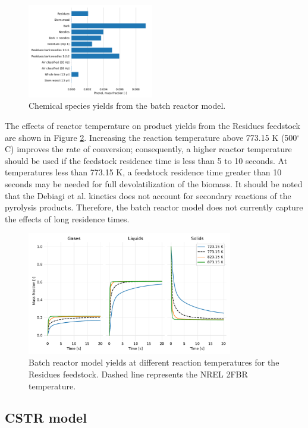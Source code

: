 \begin{figure}[H]
    \includegraphics[width=0.49\textwidth]{figures/batch-phenol.pdf}
    \caption{Chemical species yields from the batch reactor model.}
    \label{fig:batch-chemicals}
\end{figure}

The effects of reactor temperature on product yields from the Residues feedstock are shown in Figure \ref{fig:batch-temps}. Increasing the reaction temperature above 773.15 K (500$^\circ$C) improves the rate of conversion; consequently, a higher reactor temperature should be used if the feedstock residence time is less than 5 to 10 seconds. At temperatures less than 773.15 K, a feedstock residence time greater than 10 seconds may be needed for full devolatilization of the biomass. It should be noted that the Debiagi et al. kinetics does not account for secondary reactions of the pyrolysis products. Therefore, the batch reactor model does not currently capture the effects of long residence times.

\begin{figure}[H]
    \centering
    \includegraphics[width=0.8\textwidth]{figures/batch-temps.pdf}
    \caption{Batch reactor model yields at different reaction temperatures for the Residues feedstock. Dashed line represents the NREL 2FBR temperature.}
    \label{fig:batch-temps}
\end{figure}

\subsection{CSTR model}

